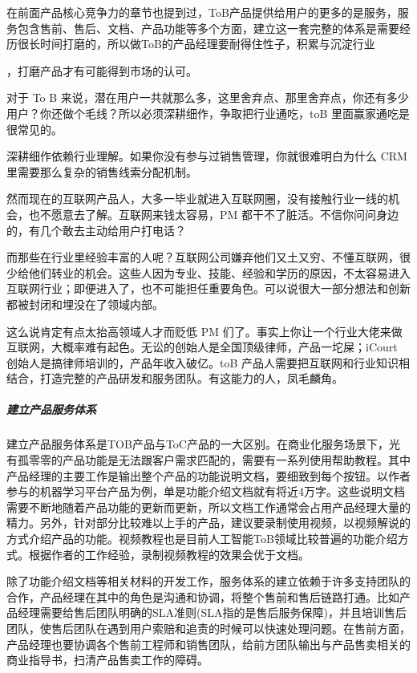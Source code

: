 \documentclass[letterpaper,11pt,english]{sphinxmanual}
\begin{document}
在前面产品核心竞争力的章节也提到过，ToB产品提供给用户的更多的是服务，服务包含售前、售后、文档、产品功能等多个方面，建立这一套完整的体系是需要经历很长时间打磨的，所以做ToB的产品经理要耐得住性子，积累与沉淀行业%
\begin{footnote}[55]\sphinxAtStartFootnote
{}
%
\end{footnote}，打磨产品才有可能得到市场的认可。

对于 To B
来说，潜在用户一共就那么多，这里舍弃点、那里舍弃点，你还有多少用户？你还做个毛线？所以必须深耕细作，争取把行业通吃，toB
里面赢家通吃是很常见的。

深耕细作依赖行业理解。如果你没有参与过销售管理，你就很难明白为什么 CRM
里需要那么复杂的销售线索分配机制。

然而现在的互联网产品人，大多一毕业就进入互联网圈，没有接触行业一线的机会，也不愿意去了解。互联网来钱太容易，PM
都干不了脏活。不信你问问身边的，有几个敢去主动给用户打电话？

而那些在行业里经验丰富的人呢？互联网公司嫌弃他们又土又穷、不懂互联网，很少给他们转业的机会。这些人因为专业、技能、经验和学历的原因，不太容易进入互联网行业；即便进入了，也不可能担任重要角色。可以说很大一部分想法和创新都被封闭和埋没在了领域内部。

这么说肯定有点太抬高领域人才而贬低 PM
们了。事实上你让一个行业大佬来做互联网，大概率难有起色。无讼的创始人是全国顶级律师，产品一坨屎；iCourt
创始人是搞律师培训的，产品年收入破亿。toB
产品人需要把互联网和行业知识相结合，打造完整的产品研发和服务团队。有这能力的人，凤毛麟角。


\subparagraph{建立产品服务体系}
\label{\detokenize{chapter_introduction/2B:id20}}
建立产品服务体系是TOB产品与ToC产品的一大区别。在商业化服务场景下，光有孤零零的产品功能是无法跟客户需求匹配的，需要有一系列使用帮助教程。其中产品经理的主要工作是输出整个产品的功能说明文档，要细致到每个按钮。以作者参与的机器学习平台产品为例，单是功能介绍文档就有将近4万字。这些说明文档需要不断地随着产品功能的更新而更新，所以文档工作通常会占用产品经理大量的精力。另外，针对部分比较难以上手的产品，建议要录制使用视频，以视频解说的方式介绍产品的功能。视频教程也是目前人工智能ToB领域比较普遍的功能介绍方式。根据作者的工作经验，录制视频教程的效果会优于文档。

除了功能介绍文档等相关材料的开发工作，服务体系的建立依赖于许多支持团队的合作，产品经理在其中的角色是沟通和协调，将整个售前和售后链路打通。比如产品经理需要给售后团队明确的SLA准则(SLA指的是售后服务保障)，并且培训售后团队，使售后团队在遇到用户索赔和追责的时候可以快速处理问题。在售前方面，产品经理也要协调各个售前工程师和销售团队，给前方团队输出与产品售卖相关的商业指导书，扫清产品售卖工作的障碍。
\end{document}
